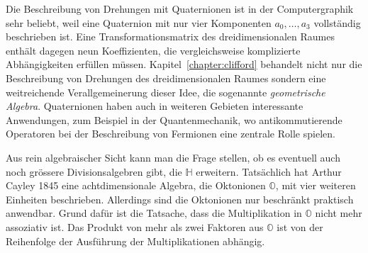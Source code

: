 Die Beschreibung von Drehungen mit Quaternionen ist in der
Computergraphik sehr beliebt, weil eine Quaternion mit nur vier
Komponenten $a_0,\dots,a_3$ vollständig beschrieben ist.
Eine Transformationsmatrix des dreidimensionalen Raumes enthält
dagegen neun Koeffizienten, die vergleichsweise komplizierte 
Abhängigkeiten erfüllen müssen.
Kapitel~\ref{chapter:clifford} behandelt nicht nur die Beschreibung
von Drehungen des dreidimensionalen Raumes sondern eine weitreichende
Verallgemeinerung dieser Idee, die sogenannte {\em geometrische Algebra}.
%
Quaternionen haben auch in weiteren Gebieten interessante Anwendungen,
zum Beispiel in der Quantenmechanik, wo antikommutierende Operatoren
%
bei der Beschreibung von Fermionen eine zentrale Rolle spielen.
%

Aus rein algebraischer Sicht kann man die Frage stellen, ob es eventuell
auch noch grössere Divisionsalgebren gibt, die $\mathbb{H}$ erweitern.
Tatsächlich hat Arthur Cayley 1845 eine achtdimensionale Algebra,
die Oktonionen $\mathbb{O}$, mit vier weiteren Einheiten beschrieben.
%
Allerdings sind die Oktonionen nur beschränkt praktisch anwendbar.
Grund dafür ist die Tatsache, dass die Multiplikation in $\mathbb{O}$
nicht mehr assoziativ ist.
Das Produkt von mehr als zwei Faktoren aus $\mathbb{O}$ ist von der
Reihenfolge der Ausführung der Multiplikationen abhängig.







